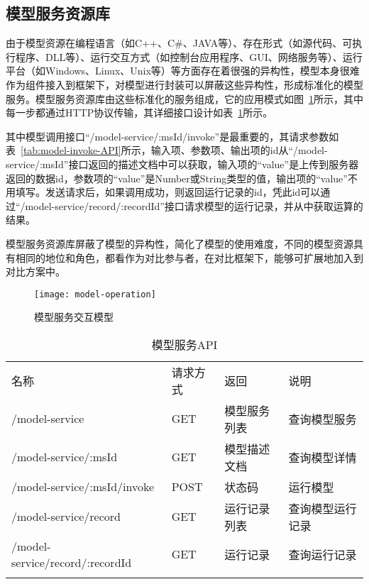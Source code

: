 \subsection{模型服务资源库}
由于模型资源在编程语言（如C++、C\#、JAVA等）、存在形式（如源代码、可执行程序、DLL等）、运行交互方式（如控制台应用程序、GUI、网络服务等）、运行平台（如Windows、Linux、Unix等）等方面存在着很强的异构性，模型本身很难作为组件接入到框架下，对模型进行封装可以屏蔽这些异构性，形成标准化的模型服务。模型服务资源库由这些标准化的服务组成，它的应用模式如图~\ref{fig:model-operation}所示，其中每一步都通过HTTP协议传输，其详细接口设计如表~\ref{tab:model-service-API}所示。

其中模型调用接口“/model-service/:msId/invoke”是最重要的，其请求参数如表~\ref{tab:model-invoke-API}所示，输入项、参数项、输出项的id从“/model-service/:msId”接口返回的描述文档中可以获取，输入项的“value”是上传到服务器返回的数据id，参数项的“value”是Number或String类型的值，输出项的“value”不用填写。发送请求后，如果调用成功，则返回运行记录的id，凭此id可以通过“/model-service/record/:recordId”接口请求模型的运行记录，并从中获取运算的结果。

模型服务资源库屏蔽了模型的异构性，简化了模型的使用难度，不同的模型资源具有相同的地位和角色，都看作为对比参与者，在对比框架下，能够可扩展地加入到对比方案中。

\begin{figure}[!htbp]
    \centering
    \texttt{[image: model-operation]}
    \caption{模型服务交互模型}
    \label{fig:model-operation}
\end{figure}

\begin{table}[!htbp]
    \centering
    \caption{模型服务API}
    \label{tab:model-service-API}
    \begin{tabular}{llll}
        \Xhline{1.5pt}
        名称 & 请求方式 & 返回 & 说明 \\
        \Xhline{1.5pt}
        /model-service & GET & 模型服务列表 & 查询模型服务 \\
        /model-service/:msId & GET & 模型描述文档 & 查询模型详情 \\
        /model-service/:msId/invoke & POST & 状态码 & 运行模型 \\ 
        /model-service/record & GET & 运行记录列表 & 查询模型运行记录 \\
        /model-service/record/:recordId & GET & 运行记录 & 查询运行记录 \\
        \Xhline{1.5pt}
    \end{tabular}
\end{table}

